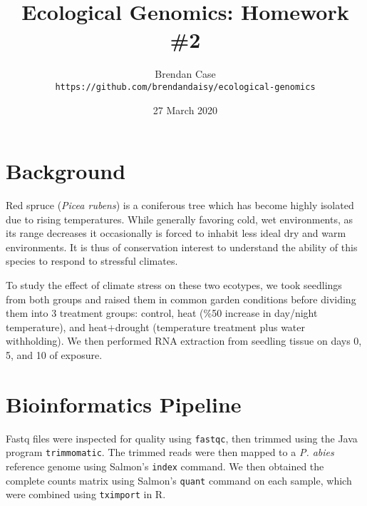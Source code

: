 \documentclass[11pt]{scrartcl}
\title{Ecological Genomics: Homework \#2}
\author{Brendan Case\\
\footnotesize{\texttt{https://github.com/brendandaisy/ecological-genomics}}}
\date{27 March 2020}
\begin{document}
\maketitle

\section{Background}
\label{sec:background}

Red spruce (\textit{Picea rubens}) is a coniferous tree which has
become highly isolated due to rising temperatures. While generally
favoring cold, wet environments, as its range decreases it
occasionally is forced to inhabit less ideal dry and warm
environments. It is thus of conservation interest to understand the
ability of this species to respond to stressful climates.

To study the effect of climate stress on these two ecotypes, we took
seedlings from both groups and raised them in common garden conditions
before dividing them into 3 treatment groups: control, heat (\%50
increase in day/night temperature), and heat$+$drought (temperature
treatment plus water withholding). We then performed RNA extraction
from seedling tissue on days 0, 5, and 10 of
exposure. %


\section{Bioinformatics Pipeline}
\label{sec:bioinf-pipel}

Fastq files were inspected for quality using \texttt{fastqc}, then
trimmed using the Java program \texttt{trimmomatic}. The trimmed reads
were then mapped to a \textit{P. abies} reference genome using
Salmon's \texttt{index} command. We then obtained the complete counts
matrix using Salmon's \texttt{quant} command on each sample, which
were combined using \texttt{tximport} in R. 
\end{document}
